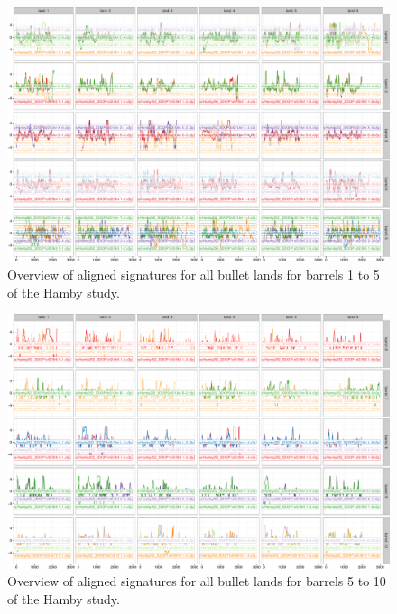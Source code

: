 \documentclass[aoas]{imsart}\usepackage[]{graphicx}\usepackage[]{color}
\newenvironment{knitrout}{}{} %
\begin{document}
\begin{landscape}
\begin{figure}[hbtp]
\begin{knitrout}
\color{fgcolor}
\includegraphics[width=7.5in]{aligned-first-1} 

\end{knitrout}
\caption{\label{fig:aligned}Overview of aligned signatures for all bullet lands for  barrels 1 to 5 of the Hamby study. }
\end{figure}

\begin{figure}[hbtp]
\begin{knitrout}
\color{fgcolor}
\includegraphics[width=7.5in]{aligned-second-1} 

\end{knitrout}
\caption{\label{fig:aligned-second}Overview of aligned signatures for all bullet lands for  barrels 5 to 10 of the Hamby study. }
\end{figure}
\end{landscape}
\newpage
\end{document}
